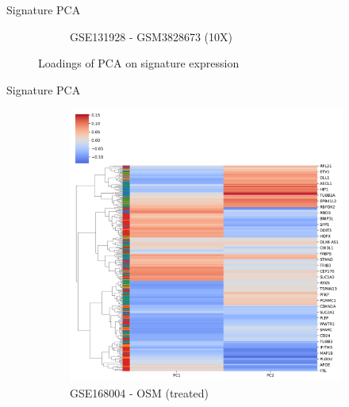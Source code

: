\documentclass[aspectratio=169,9pt]{beamer}
\begin{document}
\begin{frame}{Signature PCA}
\begin{adjustwidth}{-5cm}{-5cm}
\begin{figure}
\begin{subfigure}[b]{0.38\textwidth}
                    \caption{GSE131928 - GSM3828673 (10X)}
                \end{subfigure}
                \caption{Loadings of PCA on signature expression}
            \end{figure}
        \end{adjustwidth}
    \end{frame}

    \begin{frame}{Signature PCA}
        \begin{adjustwidth}{-5cm}{-5cm}
            \centering
            \begin{figure}\ContinuedFloat
                \centering
                \begin{subfigure}[b]{0.38\textwidth}
                    \centering
                    \includegraphics[width=\textwidth]{OSM_celllines_loadings_plot}
                    \caption{GSE168004 - OSM (treated)}
                \end{subfigure}
                \begin{subfigure}[b]{0.38\textwidth}
                    \centering

\end{subfigure}
\end{figure}
\end{adjustwidth}
\end{frame}
\end{document}
